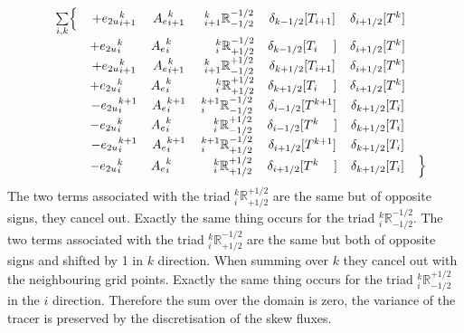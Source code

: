 \documentclass[../main/NEMO_manual]{subfiles}
\begin{document}
\begin{align*}
  \begin{matrix}
    &\sum\limits_{i,k}   \Bigl\{
    &+{e_{2u}}_{i+1}^{k}                             &{A_{e}}_{i+1    }^{k}
    &\ {_{i+1}^k \mathbb{R}_{- 1/2}^{-1/2}} &\delta_{k-1/2}[T_{i+1}]    &\delta_{i+1/2}[T^{k}]   &\\
    &&+{e_{2u}}_i^{k\ \ \ \:}                            &{A_{e}}_{i}^{k\ \ \ \:}
    &\ {\ \ \;_i^k \mathbb{R}_{+1/2}^{-1/2}}  &\delta_{k-1/2}[T_{i\ \ \ \;}]  &\delta_{i+1/2}[T^{k}] &\\
    &&+{e_{2u}}_{i+1}^{k}                             &{A_{e}}_{i+1    }^{k}
    &\ {_{i+1}^k \mathbb{R}_{- 1/2}^{+1/2}} &\delta_{k+1/2}[T_{i+1}]     &\delta_{i+1/2}[T^{k}] &\\
    &&+{e_{2u}}_i^{k\ \ \ \:}                            &{A_{e}}_{i}^{k\ \ \ \:}
    &\ {\ \ \;_i^k \mathbb{R}_{+1/2}^{+1/2}} &\delta_{k+1/2}[T_{i\ \ \ \;}] &\delta_{i+1/2}[T^{k}] &\\
    &&-{e_{2u}}_i^{k+1}                                &{A_{e}}_i^{k+1}
    &{_i^{k+1} \mathbb{R}_{-1/2}^{- 1/2}}   &\delta_{i-1/2}[T^{k+1}]      &\delta_{k+1/2}[T_{i}] &\\
    &&-{e_{2u}}_i^{k\ \ \ \:}                             &{A_{e}}_i^{k\ \ \ \:}
    &{\ \ \;_i^k  \mathbb{R}_{-1/2}^{+1/2}}   &\delta_{i-1/2}[T^{k\ \ \ \:}]  &\delta_{k+1/2}[T_{i}] &\\
    &&-{e_{2u}}_i^{k+1    }                             &{A_{e}}_i^{k+1}
    &{_i^{k+1} \mathbb{R}_{+1/2}^{- 1/2}}   &\delta_{i+1/2}[T^{k+1}]      &\delta_{k+1/2}[T_{i}] &\\
    &&-{e_{2u}}_i^{k\ \ \ \:}                             &{A_{e}}_i^{k\ \ \ \:}
    &{\ \ \;_i^k  \mathbb{R}_{+1/2}^{+1/2}}   &\delta_{i+1/2}[T^{k\ \ \ \:}]  &\delta_{k+1/2}[T_{i}]
    &\Bigr\}  \\
  \end{matrix}   
\end{align*}
The two terms associated with the triad ${_i^k \mathbb{R}_{+1/2}^{+1/2}}$ are the same but of opposite signs,
they cancel out. 
Exactly the same thing occurs for the triad ${_i^k \mathbb{R}_{-1/2}^{-1/2}}$.
The two terms associated with the triad ${_i^k \mathbb{R}_{+1/2}^{-1/2}}$ are the same but both of opposite signs and
shifted by 1 in $k$ direction.
When summing over $k$ they cancel out with the neighbouring grid points.
Exactly the same thing occurs for the triad ${_i^k \mathbb{R}_{-1/2}^{+1/2}}$ in the $i$ direction.
Therefore the sum over the domain is zero,
\ie the variance of the tracer is preserved by the discretisation of the skew fluxes.

\biblio

\pindex
\end{document}
